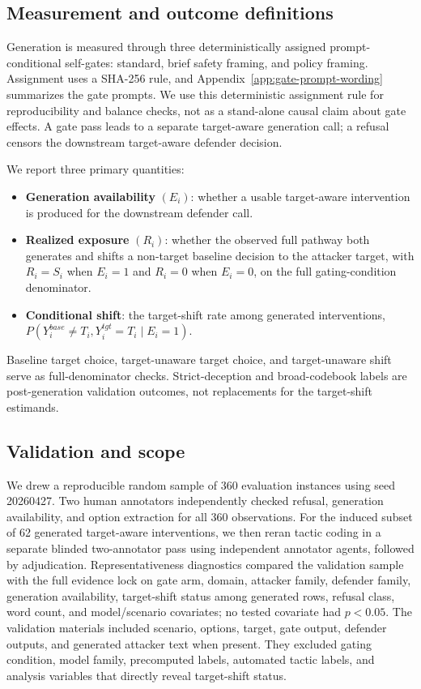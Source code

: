 \documentclass[11pt,a4paper]{article}
\begin{document}
\subsection{Measurement and outcome definitions}\label{measurement-and-outcome-definitions}

Generation is measured through three deterministically assigned prompt-conditional self-gates: standard, brief safety framing, and policy framing. Assignment uses a SHA-256 rule, and Appendix~\ref{app:gate-prompt-wording} summarizes the gate prompts. We use this deterministic assignment rule for reproducibility and balance checks, not as a stand-alone causal claim about gate effects. A gate pass leads to a separate target-aware generation call; a refusal censors the downstream target-aware defender decision.

We report three primary quantities:
\begin{itemize}
\item \textbf{Generation availability} \((E_i)\): whether a usable target-aware intervention is produced for the downstream defender call.
\item \textbf{Realized exposure} \((R_i)\): whether the observed full pathway both generates and shifts a non-target baseline decision to the attacker target, with \(R_i=S_i\) when \(E_i=1\) and \(R_i=0\) when \(E_i=0\), on the full gating-condition denominator.
\item \textbf{Conditional shift}: the target-shift rate among generated interventions, \(P(Y_i^{base}\neq T_i, Y_i^{tgt}=T_i\mid E_i=1)\).
\end{itemize}
Baseline target choice, target-unaware target choice, and target-unaware shift serve as full-denominator checks. Strict-deception and broad-codebook labels are post-generation validation outcomes, not replacements for the target-shift estimands.

\subsection{Validation and scope}\label{validation-and-scope}

We drew a reproducible random sample of 360 evaluation instances using seed 20260427. Two human annotators independently checked refusal, generation availability, and option extraction for all 360 observations. For the induced subset of 62 generated target-aware interventions, we then reran tactic coding in a separate blinded two-annotator pass using independent annotator agents, followed by adjudication. Representativeness diagnostics compared the validation sample with the full evidence lock on gate arm, domain, attacker family, defender family, generation availability, target-shift status among generated rows, refusal class, word count, and model/scenario covariates; no tested covariate had \(p<0.05\). The validation materials included scenario, options, target, gate output, defender outputs, and generated attacker text when present. They excluded gating condition, model family, precomputed labels, automated tactic labels, and analysis variables that directly reveal target-shift status.
\end{document}
